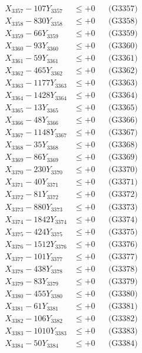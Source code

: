 \documentclass[a4paper,10pt]{article}
\begin{document}
{\begin{align}
X_{3357} - 107Y_{3357} &\leq +0 && \text{(G3357)} \\
X_{3358} - 830Y_{3358} &\leq +0 && \text{(G3358)} \\
X_{3359} - 66Y_{3359} &\leq +0 && \text{(G3359)} \\
X_{3360} - 93Y_{3360} &\leq +0 && \text{(G3360)} \\
\allowbreak
X_{3361} - 59Y_{3361} &\leq +0 && \text{(G3361)} \\
X_{3362} - 465Y_{3362} &\leq +0 && \text{(G3362)} \\
X_{3363} - 1177Y_{3363} &\leq +0 && \text{(G3363)} \\
X_{3364} - 1428Y_{3364} &\leq +0 && \text{(G3364)} \\
X_{3365} - 13Y_{3365} &\leq +0 && \text{(G3365)} \\
X_{3366} - 48Y_{3366} &\leq +0 && \text{(G3366)} \\
X_{3367} - 1148Y_{3367} &\leq +0 && \text{(G3367)} \\
X_{3368} - 35Y_{3368} &\leq +0 && \text{(G3368)} \\
X_{3369} - 86Y_{3369} &\leq +0 && \text{(G3369)} \\
X_{3370} - 230Y_{3370} &\leq +0 && \text{(G3370)} \\
\allowbreak
X_{3371} - 40Y_{3371} &\leq +0 && \text{(G3371)} \\
X_{3372} - 81Y_{3372} &\leq +0 && \text{(G3372)} \\
X_{3373} - 880Y_{3373} &\leq +0 && \text{(G3373)} \\
X_{3374} - 1842Y_{3374} &\leq +0 && \text{(G3374)} \\
X_{3375} - 424Y_{3375} &\leq +0 && \text{(G3375)} \\
X_{3376} - 1512Y_{3376} &\leq +0 && \text{(G3376)} \\
X_{3377} - 101Y_{3377} &\leq +0 && \text{(G3377)} \\
X_{3378} - 438Y_{3378} &\leq +0 && \text{(G3378)} \\
X_{3379} - 83Y_{3379} &\leq +0 && \text{(G3379)} \\
X_{3380} - 455Y_{3380} &\leq +0 && \text{(G3380)} \\
\allowbreak
X_{3381} - 61Y_{3381} &\leq +0 && \text{(G3381)} \\
X_{3382} - 106Y_{3382} &\leq +0 && \text{(G3382)} \\
X_{3383} - 1010Y_{3383} &\leq +0 && \text{(G3383)} \\
X_{3384} - 50Y_{3384} &\leq +0 && \text{(G3384)} \\

\end{align}}
\end{document}
